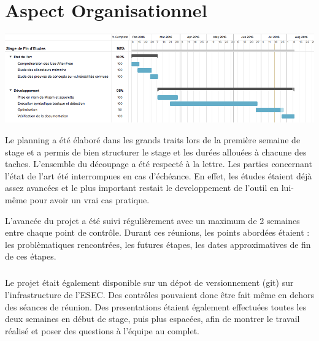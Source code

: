 \section*{Aspect Organisationnel}
\begin{center}
\includegraphics[scale=0.5]{gant.png}\newline
\end{center}

Le planning a été élaboré dans les grands traits lors de la première semaine de stage et a permis de bien structurer
le stage et les durées allouées à chacune des taches. L'ensemble du découpage a été respecté à la lettre. Les parties
concernant l'état de l'art été interrompues en cas d'échéance. En effet, les études étaient déjà assez avancées et le plus
important restait le developpement de l'outil en lui-même pour avoir un vrai cas pratique.

L'avancée du projet a été suivi régulièrement avec un maximum de 2 semaines entre chaque point de contrôle. Durant ces réunions,
les points abordées étaient : les problèmatiques rencontrées, les futures étapes, les dates approximatives de fin de ces étapes.
\subparagraph{}
Le projet était également disponible sur un dépot de versionnement (git) sur l'infrastructure de l'ESEC. Des contrôles pouvaient donc être
fait même en dehors des séances de réunion. Des presentations étaient également effectuées toutes les deux semaines en début de stage, puis plus
espacées, afin de montrer le travail réalisé et poser des questions à l'équipe au complet.
